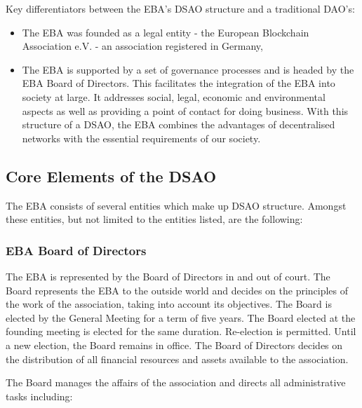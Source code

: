 \documentclass{article}
\begin{document}
Key differentiators between the EBA's DSAO structure and a traditional DAO's:

\begin{itemize}
	\item {The EBA was founded as a legal entity - the European Blockchain Association e.V. - an association registered in Germany,}
	\item {The EBA is supported by a set of governance processes and is headed by the EBA Board of Directors. This facilitates the integration of the EBA into society at large. 
	It  addresses social, legal, economic and environmental aspects  as well as providing a point of contact for doing business. With this structure of a DSAO, the EBA combines the advantages of decentralised networks with the essential requirements of our society.}
\end{itemize}

\subsection{Core Elements of the DSAO}

The EBA consists of several entities which make up DSAO structure. Amongst these entities, but not limited to the entities listed, are the following:

\subsubsection{EBA Board of Directors}

The EBA is represented by the Board of Directors in and out of court. 
The Board represents the EBA to the outside world and decides on the principles of the work of the association, taking into account its objectives. The Board is elected by the General Meeting for a term of five years. 
The Board elected at the founding meeting is elected for the same duration. 
Re-election is permitted. 
Until a new election, the Board remains in office. 
The Board of Directors decides on the distribution of all financial resources and assets available to the association.

The Board manages the affairs of the association and directs all administrative tasks including:
\end{document}
